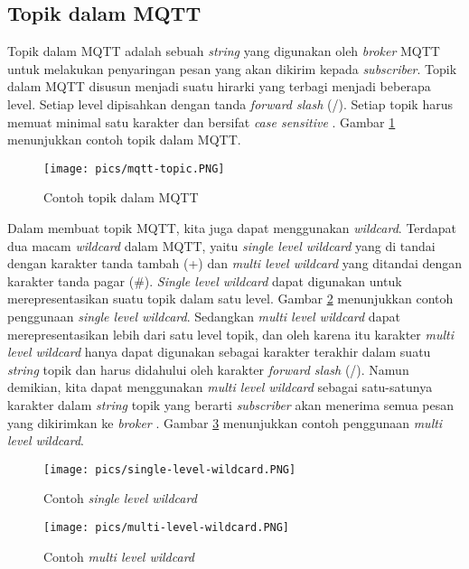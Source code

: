 \subsection{Topik dalam MQTT}
Topik dalam MQTT adalah sebuah \textit{string} yang digunakan oleh \textit{broker} MQTT untuk melakukan penyaringan pesan yang akan dikirim kepada \textit{subscriber}. Topik dalam MQTT disusun menjadi suatu hirarki yang terbagi menjadi beberapa level. Setiap level dipisahkan dengan tanda \textit{forward slash} (/). Setiap topik harus memuat minimal satu karakter dan bersifat \textit{case sensitive} \cite{hiveMQtopic}. Gambar \ref{fig:mqtt-topic} menunjukkan contoh topik dalam MQTT.

\begin{figure}
	\centering
	\texttt{[image: pics/mqtt-topic.PNG]}
	\caption{Contoh topik dalam MQTT \cite{hiveMQtopic}}
	\label{fig:mqtt-topic}
\end{figure}

Dalam membuat topik MQTT, kita juga dapat menggunakan \textit{wildcard}. Terdapat dua macam \textit{wildcard} dalam MQTT, yaitu \textit{single level wildcard} yang di tandai dengan karakter tanda tambah (+) dan \textit{multi level wildcard} yang ditandai dengan karakter tanda pagar (\#). \textit{Single level wildcard} dapat digunakan untuk merepresentasikan suatu topik dalam satu level. Gambar \ref{fig:mqtt-single-level-wildcard} menunjukkan contoh penggunaan \textit{single level wildcard}. Sedangkan \textit{multi level wildcard} dapat merepresentasikan lebih dari satu level topik, dan oleh karena itu karakter \textit{multi level wildcard} hanya dapat digunakan sebagai karakter terakhir dalam suatu \textit{string} topik dan harus didahului oleh karakter \textit{forward slash} (/). Namun demikian, kita dapat menggunakan \textit{multi level wildcard} sebagai satu-satunya karakter dalam \textit{string} topik yang berarti \textit{subscriber} akan menerima semua pesan yang dikirimkan ke \textit{broker} \cite{hiveMQtopic}. Gambar \ref{fig:mqtt-multi-level-wildcard} menunjukkan contoh penggunaan \textit{multi level wildcard}.

\begin{figure}
	\centering
	\texttt{[image: pics/single-level-wildcard.PNG]}
	\caption{Contoh \textit{single level wildcard} \cite{hiveMQtopic}}
	\label{fig:mqtt-single-level-wildcard}
\end{figure}

\begin{figure}
	\centering
	\texttt{[image: pics/multi-level-wildcard.PNG]}
	\caption{Contoh \textit{multi level wildcard} \cite{hiveMQtopic}}
	\label{fig:mqtt-multi-level-wildcard}
\end{figure}
